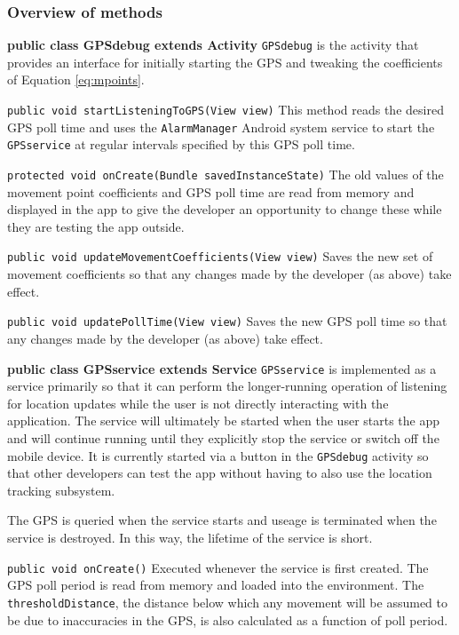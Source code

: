 \documentclass[12pt,a4paper,twoside]{article}
\begin{document}
\subsubsection{Overview of methods}
\large{\textbf{public class GPSdebug extends Activity}}\newline
\verb=GPSdebug= is the activity that provides an interface for initially starting the GPS and tweaking the coefficients of Equation \ref{eq:mpoints}.

\verb=public void startListeningToGPS(View view)=\newline
This method reads the desired GPS poll time and uses the \verb=AlarmManager= Android system service to start the \verb=GPSservice= at regular intervals specified by this GPS poll time.

\verb=protected void onCreate(Bundle savedInstanceState)=\newline
The old values of the movement point coefficients and GPS poll time are read from memory and displayed in the app to give the developer an opportunity to change these while they are testing the app outside.

\verb=public void updateMovementCoefficients(View view)=\newline
Saves the new set of movement coefficients so that any changes made by the developer (as above) take effect.

\verb=public void updatePollTime(View view)=\newline
Saves the new GPS poll time so that any changes made by the developer (as above) take effect.

\large{\textbf{public class GPSservice extends Service}}\newline
\verb=GPSservice= is implemented as a service primarily so that it can perform the longer-running operation of listening for location updates while the user is not directly interacting with the application. The service will ultimately be started when the user starts the app and will continue running until they explicitly stop the service or switch off the mobile device. It is currently started via a button in the \verb=GPSdebug= activity so that other developers can test the app without having to also use the location tracking subsystem.

The GPS is queried when the service starts and useage is terminated when the service is destroyed. In this way, the lifetime of the service is short.

\verb=public void onCreate()=\newline
Executed whenever the service is first created. The GPS poll period is read from memory and loaded into the environment. The \verb=thresholdDistance=, the distance below which any movement will be assumed to be due to inaccuracies in the GPS, is also calculated as a function of poll period.
\end{document}
